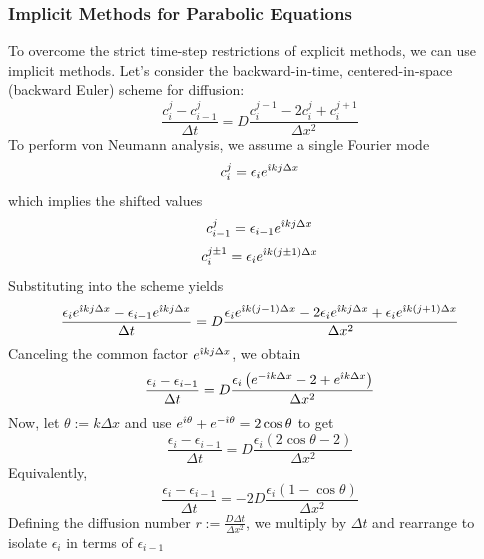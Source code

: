 \subsubsection{Implicit Methods for Parabolic Equations}

To overcome the strict time-step restrictions of explicit methods, we can use implicit methods. Let's consider the backward-in-time, centered-in-space (backward Euler) scheme for diffusion:
\begin{equation}
    \frac{c_i^j - c_{i-1}^j}{\Delta t}
    =
    D \frac{c_i^{j-1} - 2c_i^j + c_i^{j+1}}{\Delta x^2}
\end{equation}
To perform von Neumann analysis, we assume a single Fourier mode
\begin{equation}
    c_i^j = \epsilon_i e^{\hat{\imath} k j \Delta x}
\end{equation}
which implies the shifted values
\begin{equation}
    c_{i-1}^j = \epsilon_{i-1} e^{\hat{\imath} k j \Delta x}
\end{equation}
\begin{equation}
    c_i^{j\pm 1} = \epsilon_i e^{\hat{\imath} k (j\pm 1)\Delta x}
\end{equation}
Substituting into the scheme yields
\begin{equation}
    \frac{\epsilon_i e^{\hat{\imath} k j \Delta x} - \epsilon_{i-1} e^{\hat{\imath} k j \Delta x}}{\Delta t}
    =
    D \frac{\epsilon_i e^{\hat{\imath} k (j-1)\Delta x} - 2\epsilon_i e^{\hat{\imath} k j \Delta x} + \epsilon_i e^{\hat{\imath} k (j+1)\Delta x}}{\Delta x^2}
\end{equation}
Canceling the common factor $e^{\hat{\imath} k j \Delta x}$, we obtain
\begin{equation}
    \frac{\epsilon_i - \epsilon_{i-1}}{\Delta t}
    =
    D \frac{\epsilon_i \left(e^{-\hat{\imath} k \Delta x} - 2 + e^{\hat{\imath} k \Delta x}\right)}{\Delta x^2}
\end{equation}
Now, let $\theta := k\Delta x$ and use $e^{\hat{\imath}\theta}+e^{-\hat{\imath}\theta}=2\cos\theta$ to get
\begin{equation}
    \frac{\epsilon_i - \epsilon_{i-1}}{\Delta t}
    =
    D \frac{\epsilon_i \left(2\cos\theta - 2\right)}{\Delta x^2}
\end{equation}
Equivalently,
\begin{equation}
    \frac{\epsilon_i - \epsilon_{i-1}}{\Delta t}
    =
    -2D \frac{\epsilon_i \left(1-\cos\theta\right)}{\Delta x^2}
\end{equation}
Defining the diffusion number $r := \frac{D\Delta t}{\Delta x^2}$, we multiply by $\Delta t$ and rearrange to isolate $\epsilon_i$ in terms of $\epsilon_{i-1}$
